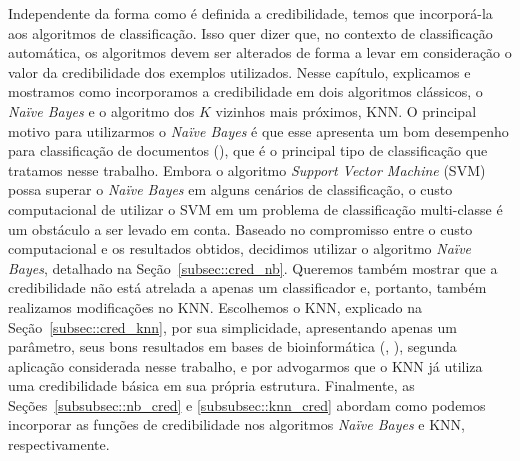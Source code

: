Independente da forma como é definida a credibilidade, temos que incorporá-la aos algoritmos de classificação. Isso quer dizer que, no contexto de classificação automática, os algoritmos devem ser alterados de forma a levar em consideração o valor da credibilidade dos exemplos utilizados. Nesse capítulo, explicamos e mostramos como incorporamos a credibilidade em dois algoritmos clássicos, o \textit{Naïve Bayes} e o algoritmo dos $K$ vizinhos mais próximos, \textsc{KNN}. O principal motivo para utilizarmos o \textit{Naïve Bayes} é que esse apresenta um bom desempenho  para classificação de documentos (\cite{Salles10}), que é o principal tipo de classificação que tratamos nesse trabalho. Embora o algoritmo \textit{Support Vector Machine} (\textsc{SVM}) possa superar o \textit{Naïve Bayes} em alguns cenários de classificação, o custo computacional de utilizar o \textsc{SVM} em um problema de classificação multi-classe é um obstáculo a ser levado em conta. Baseado no compromisso entre o custo computacional e os resultados obtidos, decidimos utilizar o algoritmo \textit{Naïve Bayes}, detalhado na Seção~\ref{subsec::cred_nb}. Queremos também mostrar que a credibilidade não está atrelada a apenas um classificador e, portanto, também realizamos modificações no \textsc{KNN}. Escolhemos o \textsc{KNN}, explicado na Seção~\ref{subsec::cred_knn}, por sua simplicidade, apresentando apenas um parâmetro, seus bons resultados em bases de bioinformática (\cite{Li04}, \cite{Yeang01}), segunda aplicação considerada nesse trabalho, e por advogarmos que o \textsc{KNN} já utiliza uma credibilidade básica em sua própria estrutura. Finalmente, as Seções~\ref{subsubsec::nb_cred} e \ref{subsubsec::knn_cred} abordam como podemos incorporar as funções de credibilidade nos algoritmos \textit{Naïve Bayes} e \textsc{KNN}, respectivamente.








